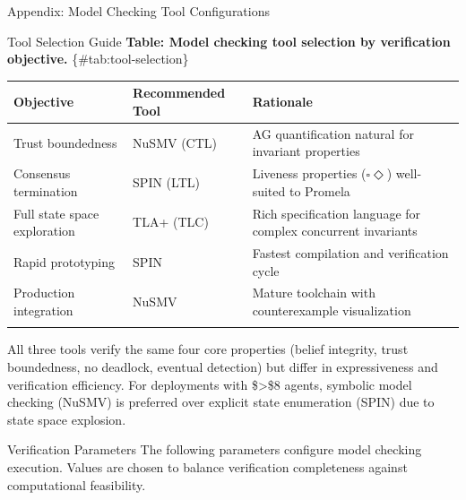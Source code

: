 \documentclass[
  ignorenonframetext,
]{beamer}
\newcounter{none} %
\begin{document}
\begin{frame}[fragile]{Appendix: Model Checking Tool Configurations}
\begin{block}{Tool Selection Guide}
\protect{}\label{sec:tool-selection}
\textbf{Table: Model checking tool selection by verification objective.}
\{\#tab:tool-selection\}

{\def\LTcaptype{none} %
\begin{longtable}[]{@{}
  >{\raggedright\arraybackslash}p{}
  >{\raggedright\arraybackslash}p{}
  >{\raggedright\arraybackslash}p{}@{}}
\toprule\noalign{}
\begin{minipage}[b]{\linewidth}\raggedright
Objective
\end{minipage} & \begin{minipage}[b]{\linewidth}\raggedright
Recommended Tool
\end{minipage} & \begin{minipage}[b]{\linewidth}\raggedright
Rationale
\end{minipage} \\
\midrule\noalign{}
\endhead
Trust boundedness & NuSMV (CTL) & AG quantification natural for
invariant properties \\
Consensus termination & SPIN (LTL) & Liveness properties
(\(\square \Diamond\)) well-suited to Promela \\
Full state space exploration & TLA+ (TLC) & Rich specification language
for complex concurrent invariants \\
Rapid prototyping & SPIN & Fastest compilation and verification cycle \\
Production integration & NuSMV & Mature toolchain with counterexample
visualization \\
\bottomrule\noalign{}
\end{longtable}
}

All three tools verify the same four core properties (belief integrity,
trust boundedness, no deadlock, eventual detection) but differ in
expressiveness and verification efficiency. For deployments with
\$\textgreater\$8 agents, symbolic model checking (NuSMV) is preferred
over explicit state enumeration (SPIN) due to state space explosion.
\end{block}

\begin{block}{Verification Parameters}
\protect{}\label{sec:verification-params}
The following parameters configure model checking execution. Values are
chosen to balance verification completeness against computational
feasibility.


\end{block}
\end{frame}
\end{document}
